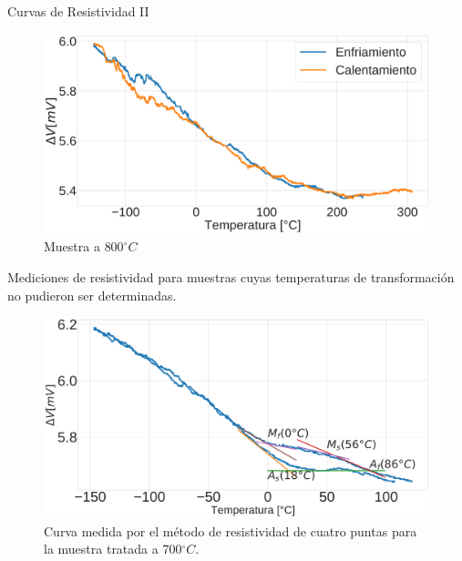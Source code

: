 \documentclass[11pt]{beamer}
\begin{document}
			\begin{frame}{Curvas de Resistividad II}
				\begin{figure}
					\includegraphics[scale=0.1]{img/Resistance_800_alt.png}
					\caption*{Muestra a $800 ^\circ C$}
				\end{figure}
				Mediciones de resistividad para muestras cuyas temperaturas de transformación no pudieron ser determinadas.
			\end{frame}
			\begin{frame}
				\begin{figure}[H]
					\centering
					\includegraphics[scale=0.18]{img/Resistance_700.png}
					\caption*{Curva medida por el método de resistividad de cuatro puntas para la muestra tratada a 700$^\circ C$.}
				\end{figure}
			\end{frame}
	
\end{document}
